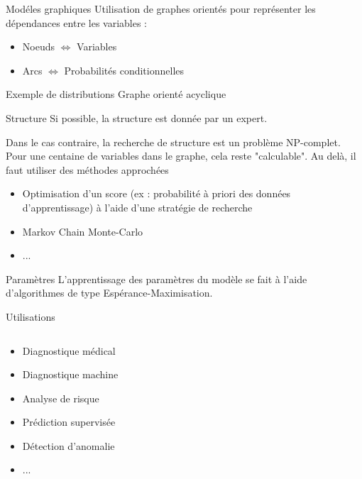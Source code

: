\begin{frame}{Modéles graphiques}
  Utilisation de graphes orientés pour représenter les dépendances entre les variables :
  \begin{itemize}
  \item Noeuds $\Leftrightarrow$ Variables
  \item Arcs $\Leftrightarrow$ Probabilités conditionnelles
  \end{itemize}
\end{frame}

\begin{frame}{Exemple de distributions}
  Graphe orienté acyclique
\end{frame}

\begin{frame}{Structure}
  Si possible, la structure est donnée par un expert.

  Dans le cas contraire, la recherche de structure est un problème NP-complet. Pour une centaine de variables dans le graphe, cela reste "calculable". Au delà, il faut utiliser des méthodes approchées
  \begin{itemize}
  \item Optimisation d'un score (ex : probabilité à priori des données d'apprentissage) à l'aide d'une stratégie de recherche
  \item Markov Chain Monte-Carlo
  \item ...
  \end{itemize}
\end{frame}

\begin{frame}{Paramètres}
  L'apprentissage des paramètres du modèle se fait à l'aide d'algorithmes de type Espérance-Maximisation.
\end{frame}

\begin{frame}{Utilisations}
  \begin{columns}
    \begin{column}{0.5\linewidth}
      \begin{itemize}
      \item Diagnostique médical
      \item Diagnostique machine
      \item Analyse de risque
      \item Prédiction supervisée
      \item Détection d'anomalie
      \item ...
      \end{itemize}
    \end{column}
    \begin{column}{0.5\linewidth}
    \end{column}
  \end{columns}
\end{frame}
